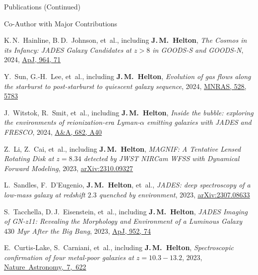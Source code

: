 \documentclass{JMH_CV}
\begin{document}
\begin{rSection}{Publications (Continued)}
\begin{rSubsection}{Co-Author with Major Contributions}{}{}{}
\begin{etaremune}
    \item K.\,N.~Hainline, B.\,D.~Johnson, et~al., including \textbf{J.\,M.~Helton}, \textit{The Cosmos in its Infancy: JADES Galaxy Candidates at $\mathit{z > 8}$ in GOODS-S and GOODS-N}, 2024, \href{https://www.scixplorer.org/abs/2024ApJ...964...71H/abstract}{\ul{ApJ, 964, 71}}

    \item Y.~Sun, G.-H.~Lee, et~al., including \textbf{J.\,M.~Helton}, \textit{Evolution of gas flows along the starburst to post-starburst to quiescent galaxy sequence}, 2024, \href{https://www.scixplorer.org/abs/2024MNRAS.528.5783S/abstract}{\ul{MNRAS, 528, 5783}}

    \item J.~Witstok, R.~Smit, et~al., including \textbf{J.\,M.~Helton}, \textit{Inside the bubble: exploring the environments of reionization-era Lyman-$\mathit{\alpha}$ emitting galaxies with JADES and FRESCO}, 2024, \href{https://www.scixplorer.org/abs/2024A&A...682A..40W/abstract}{\ul{A\&A, 682, A40}}

    \item Z.~Li, Z.~Cai, et~al., including \textbf{J.\,M.~Helton}, \textit{MAGNIF: A Tentative Lensed \mbox{Rotating} Disk at $\mathit{z = 8.34}$ detected by JWST NIRCam WFSS with Dynamical \mbox{Forward} \mbox{Modeling}}, 2023, \href{https://www.scixplorer.org/abs/2023arXiv231009327L/abstract}{\ul{arXiv:2310.09327}}

    \item L.~Sandles, F.~D'Eugenio, \textbf{J.\,M.~Helton}, et~al., \textit{JADES: deep spectroscopy of a low-mass galaxy at redshift $\mathit{2.3}$ quenched by environment}, 2023, \href{https://www.scixplorer.org/abs/2023arXiv230708633S/abstract}{\ul{arXiv:2307.08633}}

    \item S.~Tacchella, D.\,J.~Eisenstein, et~al., including \textbf{J.\,M.~Helton}, \textit{JADES Imaging of GN-z11: Revealing the Morphology and Environment of a Luminous Galaxy $\mathit{430}$ Myr After the Big Bang}, 2023, \href{https://www.scixplorer.org/abs/2023ApJ...952...74T/abstract}{\ul{ApJ, 952, 74}}

    \item E.~Curtis-Lake, S.~Carniani, et~al., including \textbf{J.\,M.~Helton}, \textit{\mbox{Spectroscopic} confirmation of four metal-poor galaxies at $\mathit{z = 10.3-13.2}$}, 2023, \href{https://www.scixplorer.org/abs/2023NatAs...7..622C/abstract}{\ul{\mbox{Nature Astronomy, 7, 622}}}


\end{etaremune}
\end{rSubsection}
\end{rSection}
\end{document}
